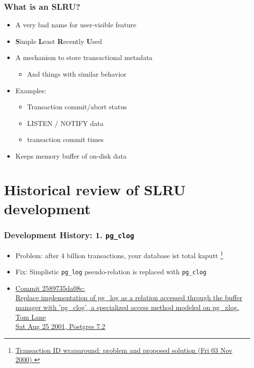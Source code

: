 \begin{frame}
   \frametitle{What {\bf is} an SLRU?}
   \begin{itemize}
     \item A very bad name for user-visible feature
      \item {\bf S}imple {\bf L}east {\bf R}ecently {\bf U}sed
      \item A mechanism to store transactional metadata
	 \begin{itemize}
	    \item And things with similar behavior
	 \end{itemize}
      \item Examples:
	 \begin{itemize}
	    \item Transaction commit/abort status
	    \item LISTEN / NOTIFY data
	    \item transaction commit times
	 \end{itemize}
      \item Keeps memory buffer of on-disk data
   \end{itemize}
\end{frame}


\section{Historical review of SLRU development}
\begin{frame}
  \sectionpage
\end{frame}


\begin{frame}
  \frametitle{Development History: 1. \texttt{pg\_clog}}
  \begin{itemize}
    \item Problem: after 4 billion transactions, your database ist total kaputt \footnote{
        \fontsize{6}{8}\selectfont \href{https://www.postgresql.org/message-id/flat/8382.973291660\%40sss.pgh.pa.us}
	{Transaction ID wraparound: problem and proposed solution (Fri 03 Nov 2000) \faExternalLink}}
    \item Fix: Simplistic \texttt{pg\_log} pseudo-relation is replaced with \texttt{pg\_clog}
    \item {\linksize \href{https://git.postgresql.org/cgit/postgresql.git/commit/?id=2589735da08c4e597accb6eab5ae65b6339ee630}
      {Commit 2589735da08c: \faExternalLink \\
      Replace implementation of pg\_log as a relation accessed through the buffer manager with 'pg\_clog', a specialized access method modeled on pg\_xlog. \\
      Tom Lane \\
      Sat Aug 25 2001, Postgres 7.2}}
  \end{itemize}
\end{frame}

